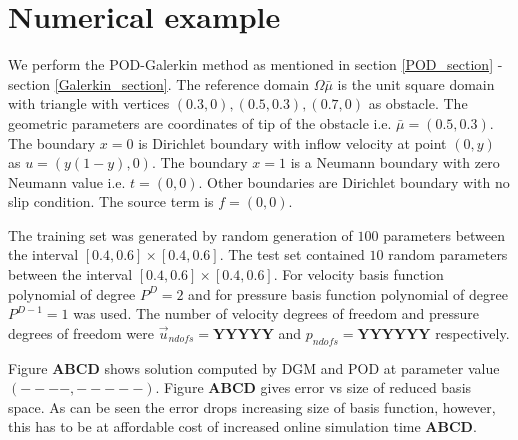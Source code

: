 \documentclass[graybox]{svmult}
\begin{document}
\section{Numerical example}

We perform the POD-Galerkin method as mentioned in section \ref{POD_section} - section \ref{Galerkin_section}. The reference domain $\Omega{\bar{\mu}}$ is the unit square domain with triangle with vertices $(0.3,0),(0.5,0.3),(0.7,0)$ as obstacle. The geometric parameters are coordinates of tip of the obstacle i.e. $\bar{\mu} = (0.5,0.3)$. The boundary ${x=0}$ is Dirichlet boundary with inflow velocity at point $(0,y)$ as $u = (y(1-y), 0)$. The boundary ${x = 1}$ is a Neumann boundary with zero Neumann value i.e. $t = (0, 0)$. Other boundaries are Dirichlet boundary with no slip condition. The source term is $f = (0,0)$.

The training set was generated by random generation of $100$ parameters between the interval $[0.4,0.6] \times [0.4,0.6]$. The test set contained $10$ random parameters between the interval $[0.4,0.6] \times [0.4,0.6]$. For velocity basis function polynomial of degree $P^D = 2$ and for pressure basis function polynomial of degree $P^{D-1} = 1$ was used. The number of velocity degrees of freedom and pressure degrees of freedom were $\overrightarrow{u}_{ndofs} = \textbf{YYYYY}$ and $p_{ndofs} = \textbf{YYYYYY}$ respectively.

Figure \textbf{ABCD} shows solution computed by DGM and POD at parameter value $(----,-----)$. Figure \textbf{ABCD} gives error vs size of reduced basis space. As can be seen the error drops increasing size of basis function, however, this has to be at affordable cost of increased online simulation time \textbf{ABCD}.
\end{document}
